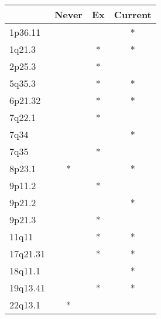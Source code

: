 \begin{tabular}{lccc}
\toprule
{} & Never & Ex & Current \\
\midrule
1p36.11  &       &    &       * \\
1q21.3   &       &  * &       * \\
2p25.3   &       &  * &         \\
5q35.3   &       &  * &       * \\
6p21.32  &       &  * &       * \\
7q22.1   &       &  * &         \\
7q34     &       &    &       * \\
7q35     &       &  * &         \\
8p23.1   &     * &    &       * \\
9p11.2   &       &  * &         \\
9p21.2   &       &    &       * \\
9p21.3   &       &  * &         \\
11q11    &       &  * &       * \\
17q21.31 &       &  * &       * \\
18q11.1  &       &    &       * \\
19q13.41 &       &  * &       * \\
22q13.1  &     * &    &         \\
\bottomrule
\end{tabular}
